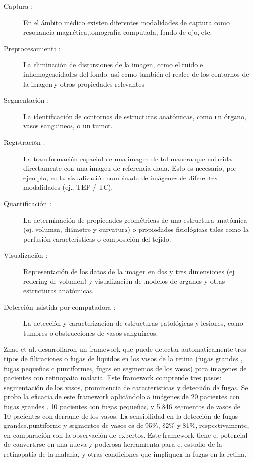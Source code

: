 \begin{description}
\item [Captura :]  En el ámbito médico existen diferentes modalidades de captura como resonancia magnética,tomografía computada, fondo de ojo, etc. 
\item [Preprocesamiento :] La eliminación de distorsiones de la imagen, como el ruido e inhomogeneidades del fondo, así como también el realce de los contornos de la imagen y otras propiedades relevantes.
\item [Segmentación :] La identificación de contornos de estructuras anatómicas, como un órgano, vasos sanguíneos, o un tumor.
\item [Registración :] La transformación espacial de una imagen de tal manera que coincida directamente con  una imagen de referencia dada. Esto es necesario, por ejemplo, en la visualización combinada de imágenes de diferentes modalidades (ej., TEP / TC).
\item [Quantificación :] La determinación de propiedades geométricas de una estructura anatómica (ej. volumen, diámetro y curvatura) o propiedades fisiológicas tales como la perfusión características o composición del tejido.
\item [Visualización :] Representación de los datos de la imagen en dos y tres dimensiones (ej. redering de volumen) y visualización de modelos de órganos y otras estructuras anatómicas.
\item [Detección asistida por computadora :] La detección y caracterización de estructuras patológicas y lesiones, como tumores o obstrucciones de vasos sanguíneos. \cite{ritter2011medical} 
\end{description}




Zhao et al. \cite{zhao2015retinal} desarrollaron un framework que puede detectar automaticamente tres tipos de filtraciones o fugas de liquidos en los vasos de la retina (fugas grandes , fugas pequeñas o puntiformes, fugas en segmentos de los vasos) para imagenes de pacientes con retinopatia malaria. Este framework comprende tres pasos: segmentación de los vasos, prominencia de caracteristicas y detección de fugas. Se probo la eficacia de este framework aplicándolo a imágenes de 20 pacientes con fugas grandes , 10 pacientes con fugas pequeñas, y 5.846 segmentos de vasos de 10 pacientes con derrame de los vasos.
La sensibilidad en la detección de fugas grandes,puntiforme y segmentos de vasos es de 95\%, 82\% y
81\%, respectivamente, en comparación con la observación de expertos. Este framework tiene el potencial de convertirse en una nueva y poderosa herramienta para el estudio de la retinopatía de la malaria, y otras condiciones que impliquen la fugas en la retina.


